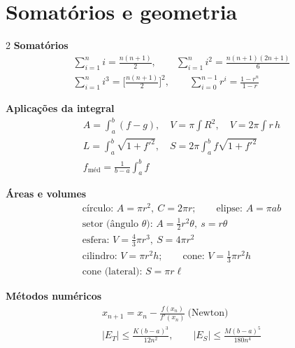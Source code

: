 \section{Somatórios e geometria}
\begin{multicols}{2}\small
\textbf{Somatórios}
\begin{gather*}
\sum_{i=1}^n i=\frac{n(n+1)}2,\qquad \sum_{i=1}^n i^2=\frac{n(n+1)(2n+1)}6\\
\sum_{i=1}^n i^3=\Big[\frac{n(n+1)}2\Big]^2,\qquad \sum_{i=0}^{n-1}r^i=\frac{1-r^n}{1-r}
\end{gather*}

\textbf{Aplicações da integral}
\begin{gather*}
A=\int_a^b(f-g),\quad V=\pi\int R^2,\quad V=2\pi\int r\,h\\
L=\int_a^b\sqrt{1+f'^2},\quad S=2\pi\int_a^bf\sqrt{1+f'^2}\\
f_{\text{méd}}=\frac1{b-a}\int_a^bf
\end{gather*}

\columnbreak
\textbf{Áreas e volumes}
\begin{gather*}
\text{círculo: }A=\pi r^2,\ C=2\pi r;\qquad \text{elipse: }A=\pi ab\\
\text{setor (ângulo $\theta$): }A=\tfrac12r^2\theta,\ s=r\theta\\
\text{esfera: }V=\tfrac43\pi r^3,\ S=4\pi r^2\\
\text{cilindro: }V=\pi r^2h;\qquad \text{cone: }V=\tfrac13\pi r^2h\\
\text{cone (lateral): }S=\pi r\ell
\end{gather*}

\textbf{Métodos numéricos}
\begin{gather*}
x_{n+1}=x_n-\frac{f(x_n)}{f'(x_n)}\ \text{(Newton)}\\
|E_T|\le\frac{K(b-a)^3}{12n^2},\qquad |E_S|\le\frac{M(b-a)^5}{180n^4}
\end{gather*}
\end{multicols}
